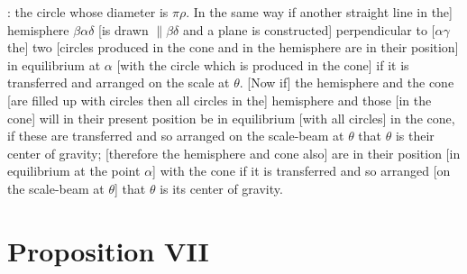 \documentclass[12pt]{article}
\begin{document}
: the circle whose diameter is $\pi\rho$.  In the same way if another
straight line in the] hemisphere $\beta\alpha\delta$ [is drawn $\|
\beta\delta$ and a plane is constructed] perpendicular to
[$\alpha\gamma$ the] two [circles produced in the cone and in the
hemisphere are in their position] in equilibrium at $\alpha$ [with the
circle which is produced in the cone] if it is transferred and
arranged on the scale at $\theta$.  [Now if] the hemisphere and the
cone [are filled up with circles then all circles in the] hemisphere
and those [in the cone] will in their present position be in
equilibrium [with all circles] in the cone, if these are transferred
and so arranged on the scale-beam at $\theta$ that $\theta$ is their
center of gravity; [therefore the hemisphere and cone also] are in
their position [in equilibrium at the point $\alpha$] with the cone if
it is transferred and so arranged [on the scale-beam at $\theta$] that
$\theta$ is its center of gravity.


\section*{Proposition VII}
\end{document}
